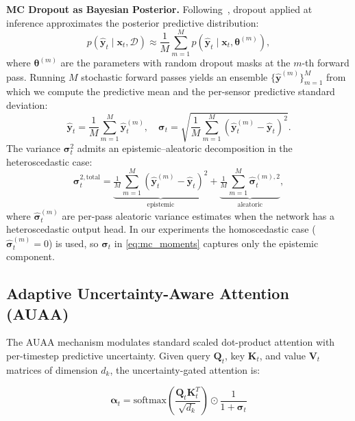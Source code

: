 \textbf{MC Dropout as Bayesian Posterior.} Following~\cite{gal2016dropout_bayesian}, dropout applied at inference approximates the posterior predictive distribution:
\begin{equation}
p(\hat{\mathbf{y}}_t \mid \mathbf{x}_t, \mathcal{D}) \approx \frac{1}{M}\sum_{m=1}^{M} p\!\left(\hat{\mathbf{y}}_t \mid \mathbf{x}_t, \boldsymbol{\theta}^{(m)}\right),
\label{eq:bayes_post}
\end{equation}
where $\boldsymbol{\theta}^{(m)}$ are the parameters with random dropout masks at the $m$-th forward pass. Running $M$ stochastic forward passes yields an ensemble $\{\hat{\mathbf{y}}^{(m)}\}_{m=1}^{M}$ from which we compute the predictive mean and the per-sensor predictive standard deviation:
\begin{equation}
\hat{\mathbf{y}}_t = \frac{1}{M}\sum_{m=1}^{M} \hat{\mathbf{y}}_t^{(m)}, \quad \boldsymbol{\sigma}_t = \sqrt{\frac{1}{M}\sum_{m=1}^{M} (\hat{\mathbf{y}}_t^{(m)} - \hat{\mathbf{y}}_t)^2}.
\label{eq:mc_moments}
\end{equation}
The variance $\boldsymbol{\sigma}_t^2$ admits an epistemic--aleatoric decomposition in the heteroscedastic case:
\begin{equation}
\boldsymbol{\sigma}_t^{2,\text{total}}
= \underbrace{\tfrac{1}{M}\sum_{m=1}^{M}(\hat{\mathbf{y}}_t^{(m)} - \hat{\mathbf{y}}_t)^2}_{\text{epistemic}}
+ \underbrace{\tfrac{1}{M}\sum_{m=1}^{M}\hat{\boldsymbol{\sigma}}_t^{(m),2}}_{\text{aleatoric}},
\label{eq:unc_decomp}
\end{equation}
where $\hat{\boldsymbol{\sigma}}_t^{(m)}$ are per-pass aleatoric variance estimates when the network has a heteroscedastic output head. In our experiments the homoscedastic case ($\hat{\boldsymbol{\sigma}}_t^{(m)}=0$) is used, so $\boldsymbol{\sigma}_t$ in \cref{eq:mc_moments} captures only the epistemic component.

\subsection{Adaptive Uncertainty-Aware Attention (AUAA)}

The AUAA mechanism modulates standard scaled dot-product attention with per-timestep predictive uncertainty. Given query $\mathbf{Q}_t$, key $\mathbf{K}_t$, and value $\mathbf{V}_t$ matrices of dimension $d_k$, the uncertainty-gated attention is:

\begin{equation}
\boldsymbol{\alpha}_t = \text{softmax}\left(\frac{\mathbf{Q}_t \mathbf{K}_t^T}{\sqrt{d_k}}\right) \odot \frac{1}{1 + \boldsymbol{\sigma}_t}
\label{eq:auaa_attention}
\end{equation}


